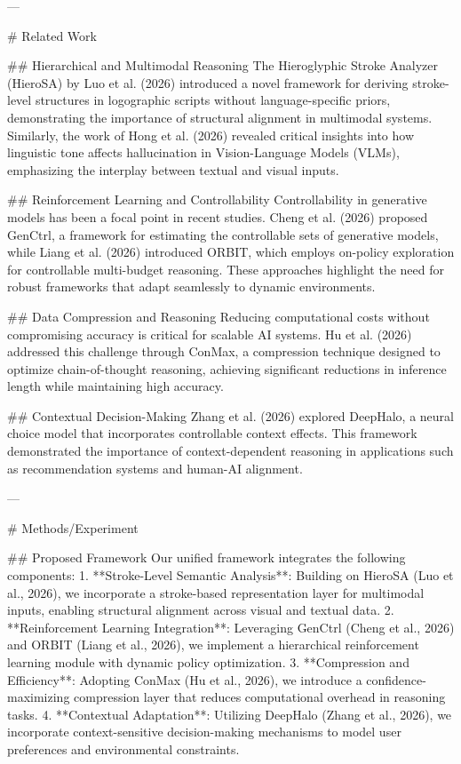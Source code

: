 ---

# Related Work  

## Hierarchical and Multimodal Reasoning  
The Hieroglyphic Stroke Analyzer (HieroSA) by Luo et al. (2026) introduced a novel framework for deriving stroke-level structures in logographic scripts without language-specific priors, demonstrating the importance of structural alignment in multimodal systems. Similarly, the work of Hong et al. (2026) revealed critical insights into how linguistic tone affects hallucination in Vision-Language Models (VLMs), emphasizing the interplay between textual and visual inputs.

## Reinforcement Learning and Controllability  
Controllability in generative models has been a focal point in recent studies. Cheng et al. (2026) proposed GenCtrl, a framework for estimating the controllable sets of generative models, while Liang et al. (2026) introduced ORBIT, which employs on-policy exploration for controllable multi-budget reasoning. These approaches highlight the need for robust frameworks that adapt seamlessly to dynamic environments.

## Data Compression and Reasoning  
Reducing computational costs without compromising accuracy is critical for scalable AI systems. Hu et al. (2026) addressed this challenge through ConMax, a compression technique designed to optimize chain-of-thought reasoning, achieving significant reductions in inference length while maintaining high accuracy.

## Contextual Decision-Making  
Zhang et al. (2026) explored DeepHalo, a neural choice model that incorporates controllable context effects. This framework demonstrated the importance of context-dependent reasoning in applications such as recommendation systems and human-AI alignment.

---

# Methods/Experiment  

## Proposed Framework  
Our unified framework integrates the following components:  
1. **Stroke-Level Semantic Analysis**: Building on HieroSA (Luo et al., 2026), we incorporate a stroke-based representation layer for multimodal inputs, enabling structural alignment across visual and textual data.  
2. **Reinforcement Learning Integration**: Leveraging GenCtrl (Cheng et al., 2026) and ORBIT (Liang et al., 2026), we implement a hierarchical reinforcement learning module with dynamic policy optimization.  
3. **Compression and Efficiency**: Adopting ConMax (Hu et al., 2026), we introduce a confidence-maximizing compression layer that reduces computational overhead in reasoning tasks.  
4. **Contextual Adaptation**: Utilizing DeepHalo (Zhang et al., 2026), we incorporate context-sensitive decision-making mechanisms to model user preferences and environmental constraints.

